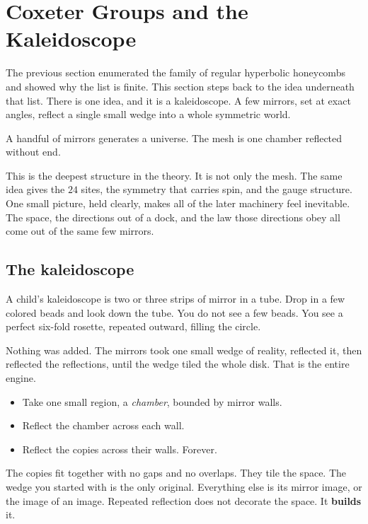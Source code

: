 \section{Coxeter Groups and the Kaleidoscope}

The previous section enumerated the family of regular hyperbolic honeycombs and showed why the list is finite. This section steps back to the idea underneath that list. There is one idea, and it is a kaleidoscope. A few mirrors, set at exact angles, reflect a single small wedge into a whole symmetric world.

\begin{principle}
A handful of mirrors generates a universe. The mesh is one chamber reflected without end.
\end{principle}

This is the deepest structure in the theory. It is not only the mesh. The same idea gives the $24$ sites, the symmetry that carries spin, and the gauge structure. One small picture, held clearly, makes all of the later machinery feel inevitable. The space, the directions out of a dock, and the law those directions obey all come out of the same few mirrors.

\subsection{The kaleidoscope}

A child's kaleidoscope is two or three strips of mirror in a tube. Drop in a few colored beads and look down the tube. You do not see a few beads. You see a perfect six-fold rosette, repeated outward, filling the circle.

Nothing was added. The mirrors took one small wedge of reality, reflected it, then reflected the reflections, until the wedge tiled the whole disk. That is the entire engine.

\begin{itemize}
\item Take one small region, a \emph{chamber}, bounded by mirror walls.
\item Reflect the chamber across each wall.
\item Reflect the copies across their walls. Forever.
\end{itemize}

The copies fit together with no gaps and no overlaps. They tile the space. The wedge you started with is the only original. Everything else is its mirror image, or the image of an image. Repeated reflection does not decorate the space. It \textbf{builds} it.

